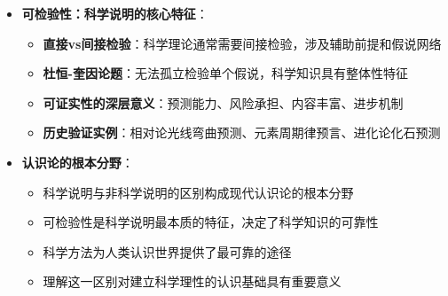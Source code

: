 \begin{center}
{{\begin{itemize}
\begin{itemize}
  \item \textbf{批判性vs权威性}：科学鼓励批判思维，非科学依赖权威
  \end{itemize}
\item \textbf{可检验性：科学说明的核心特征}：
  \begin{itemize}
  \item \textbf{直接vs间接检验}：科学理论通常需要间接检验，涉及辅助前提和假说网络
  \item \textbf{杜恒-奎因论题}：无法孤立检验单个假说，科学知识具有整体性特征
  \item \textbf{可证实性的深层意义}：预测能力、风险承担、内容丰富、进步机制
  \item \textbf{历史验证实例}：相对论光线弯曲预测、元素周期律预言、进化论化石预测
  \end{itemize}
\item \textbf{认识论的根本分野}：
  \begin{itemize}
  \item 科学说明与非科学说明的区别构成现代认识论的根本分野
  \item 可检验性是科学说明最本质的特征，决定了科学知识的可靠性
  \item 科学方法为人类认识世界提供了最可靠的途径
  \item 理解这一区别对建立科学理性的认识基础具有重要意义
  \end{itemize}
\end{itemize}
}}
\end{center}